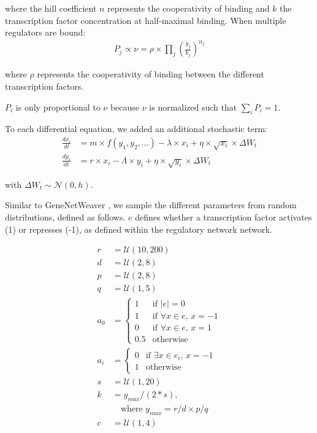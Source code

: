 where the hill coefficient $n$ represents the cooperativity of binding and $k$ the transcription factor concentration at half-maximal binding. When multiple regulators are bound:
$$
\begin{aligned}
P_j \propto \nu =  \rho \times \prod_j \left(\frac{y_j}{k_j}\right)^{n_j}
\end{aligned}
$$

where $\rho$ represents the cooperativity of binding between the different transcription factors. 

$P_i$ is only proportional to $\nu$ because $\nu$ is normalized such that $\sum_{i} P_i = 1$.

To each differential equation, we added an additional stochastic term: 
$$
\begin{aligned}
\frac{dx_i}{dt} & = m \times f(y_1, y_2, ...) - \lambda \times x_i + \eta \times \sqrt{x_i} \times \Delta W_t \\
\frac{dy_i}{dt} & = r \times x_i - \Lambda \times y_i + \eta \times \sqrt{y_i} \times \Delta W_t
\end{aligned}
$$

with $\Delta W_t \sim \mathcal{N}(0, h)$. 

Similar to GeneNetWeaver \cite{schaffter_genenetweaversilicobenchmark_2011}, we sample the different parameters from random distributions, defined as follows. $e$ defines whether a transcription factor activates (1) or represses (-1), as defined within the regulatory network network.

$$
\begin{aligned}
r & = \mathcal{U}(10, 200) \\
d & = \mathcal{U}(2, 8) \\
p & = \mathcal{U}(2, 8) \\
q & = \mathcal{U}(1, 5) \\
a_0 & = \begin{cases}1 & \text{if } |e| = 0 \\ 1 & \text{if } \forall x \in e \text{, } x = -1 \\ 0 & \text{if } \forall x \in e \text{, } x = 1 \\ 0.5 & \text{otherwise}\end{cases} \\
a_i & = \begin{cases}0 & \text{if } \exists x \in e_i \text{, } x = -1 \\ 1 & \text{otherwise}\end{cases} \\
s & = \mathcal{U}(1, 20) \\
k & = y_{max} / (2 * s) \text{,} \\
\ & \quad \text{where } y_{max} = r / d \times p / q \\
c & = \mathcal{U}(1, 4)
\end{aligned}
$$

